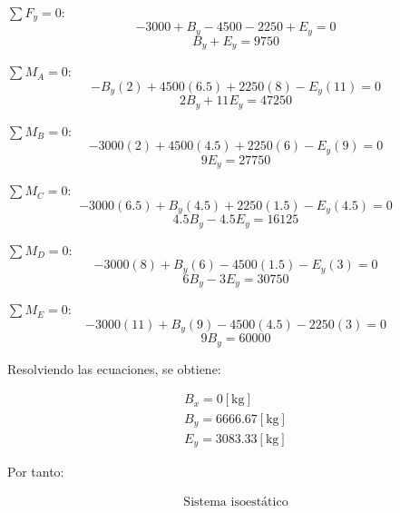 \documentclass[letter,10pt,twoside]{article}
\begin{document}
$\sum{F_y} = 0$:
\begin{equation*}
    -3000 + B_y - 4500 - 2250 + E_y = 0
\end{equation*}
\begin{equation*}
    B_y + E_y = 9750
\end{equation*}

$\sum{M_A} = 0$:
\begin{equation*}
    - B_y(2) + 4500(6.5) + 2250(8) - E_y(11) = 0
\end{equation*}
\begin{equation*}
    2 B_y + 11 E_y = 47250
\end{equation*}

$\sum{M_B} = 0$:
\begin{equation*}
    -3000(2) + 4500(4.5) + 2250(6) - E_y(9) = 0
\end{equation*}
\begin{equation*}
    9 E_y = 27750
\end{equation*}

$\sum{M_C} = 0$:
\begin{equation*}
    -3000(6.5) + B_y(4.5) + 2250(1.5) - E_y(4.5) = 0
\end{equation*}
\begin{equation*}
    4.5 B_y - 4.5 E_y = 16125
\end{equation*}

$\sum{M_D} = 0$:
\begin{equation*}
    -3000(8) + B_y(6) - 4500(1.5) - E_y(3) = 0
\end{equation*}
\begin{equation*}
    6 B_y - 3 E_y = 30750
\end{equation*}

$\sum{M_E} = 0$:
\begin{equation*}
    -3000(11) + B_y(9) - 4500(4.5) - 2250(3) = 0
\end{equation*}
\begin{equation*}
    9 B_y = 60000
\end{equation*}

Resolviendo las ecuaciones, se obtiene:

\begin{equation*}
\boxed{
    \begin{array}{l}
        B_x = 0[\text{kg}] \\
        B_y = 6666.67[\text{kg}] \\
        E_y = 3083.33[\text{kg}]
    \end{array}
}
\end{equation*}

Por tanto:

\begin{equation*}
\boxed{
    \begin{array}{l}
        \text{Sistema isoestático}
    \end{array}
}
\end{equation*}
\end{document}
